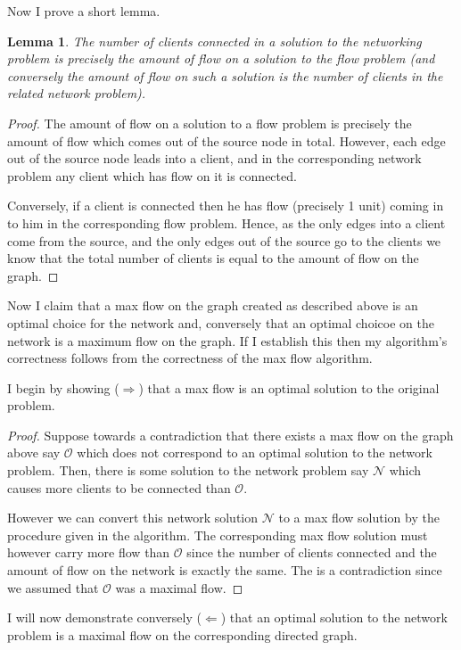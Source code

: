 \documentclass{article}
\newtheorem{lemma}[theorem]{Lemma}
\begin{document}
Now I prove a short lemma.

\begin{lemma}The number of clients connected in a solution to the networking problem is precisely the amount of flow on a solution to the flow problem (and conversely the amount of flow on such a solution is the number of clients in the related network problem).\end{lemma}
\begin{proof}
The amount of flow on a solution to a flow problem is precisely the amount of flow which comes out of the source node in total. However, each edge out of the source node leads into a client, and in the corresponding network problem any client which has flow on it is connected.

Conversely, if a client is connected then he has flow  (precisely 1 unit) coming in to him in the corresponding flow problem. Hence, as the only edges into a client come from the source, and the only edges out of the source go to the clients we know that the total number of clients is equal to the amount of flow on the graph.
\end{proof}


Now I claim that a max flow on the graph created as described above is an optimal choice for the network and, conversely that an optimal choicoe on the network is a maximum flow on the graph. If I establish this then my algorithm's correctness follows from the correctness of the max flow algorithm.

I begin by showing ($\Rightarrow$) that a max flow is an optimal solution to the original problem.
\begin{proof}Suppose towards a contradiction that there exists a max flow on the graph above say $\mathcal{O}$ which does not correspond to an optimal solution to the network problem. Then, there is some solution to the network problem say $\mathcal{N}$ which causes more clients to be connected than $\mathcal{O}$.

However we can convert this network solution $\mathcal{N}$ to a max flow solution by the procedure given in the algorithm. The corresponding max flow solution must however carry more flow than $\mathcal{O}$ since the number of clients connected and the amount of flow on the network is exactly the same. The is a contradiction since we assumed that $\mathcal{O}$ was a maximal flow.
\end{proof}

I will now demonstrate conversely  ($\Leftarrow$) that an optimal solution to the network problem is a maximal flow on the corresponding directed graph.
\end{document}
